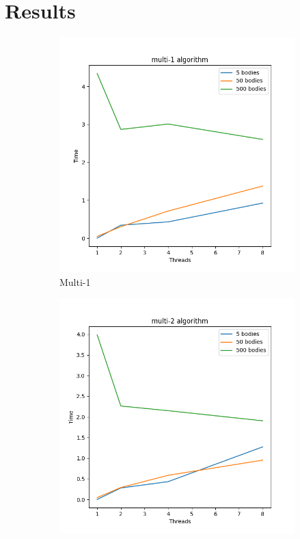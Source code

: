 \documentclass[12pt]{article}
\begin{document}
\section{Results}

\begin{figure}[hbt!]
    \centering
    \begin{subfigure}[b]{0.32\textwidth}
        \centering
        \includegraphics[width=\textwidth]{simulation/thread_algo_multi-1.png}
        \caption{Multi-1}
        \label{figure:multi-1-algo}
    \end{subfigure}
    \hfill
    \begin{subfigure}[b]{0.32\textwidth}
        \centering
        \includegraphics[width=\textwidth]{simulation/thread_algo_multi-2.png}

\end{subfigure}
\end{figure}
\end{document}
